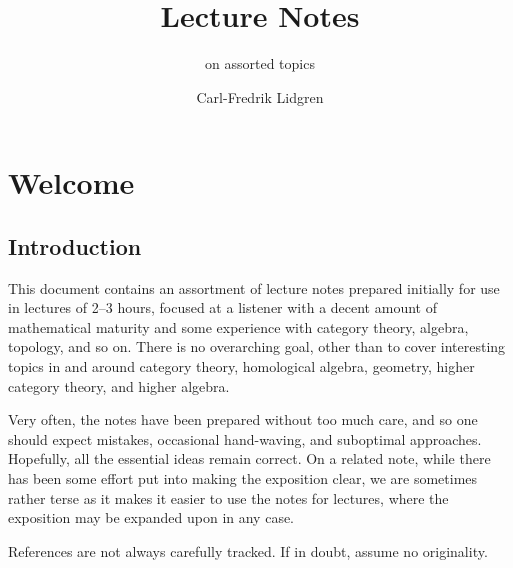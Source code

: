 \documentclass[a4paper, 11pt]{article}
\title{Lecture Notes}
\author{on assorted topics}
\date{Carl-Fredrik Lidgren}
\newcommand{\1}{\ensuremath{\mathbb{1}}}
\newcommand{\2}{\ensuremath{\mathbb{2}}}
\newcommand{\3}{\ensuremath{\mathbb{3}}}
\begin{document}
\maketitle


\tableofcontents

\clearpage
\setcounter{section}{-1}
\section{Welcome}
\subsection{Introduction}
This document contains an assortment of lecture notes prepared initially for use
in lectures of 2--3 hours, focused at a listener with a decent amount of
mathematical maturity and some experience with category theory, algebra,
topology, and so on. There is no overarching goal, other than to cover
interesting topics in and around category theory, homological algebra, geometry,
higher category theory, and higher algebra.

Very often, the notes have been prepared without too much care, and so one should expect mistakes, occasional hand-waving, and suboptimal approaches. Hopefully, all the essential ideas
remain correct. On a related note, while there has been some effort put into making the exposition clear, we are sometimes rather terse as it makes it easier to use the notes
for lectures, where the exposition may be expanded upon in any case.

References are not always carefully tracked. If in doubt, assume no originality.
\end{document}
